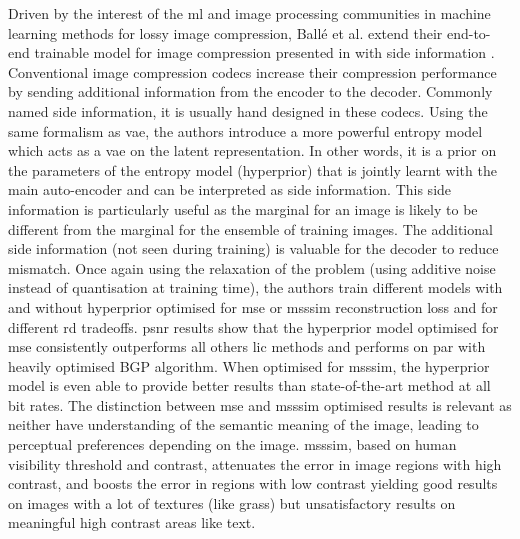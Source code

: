 \documentclass{article}
\begin{document}
Driven by the interest of the \acrshort{ml} and image processing communities in machine learning methods for lossy image compression, Ballé et al. extend their end-to-end trainable model for image compression presented in \cite{balle2017endtoendoptimizedimagecompression} with side information \cite{balle2018variationalimagecompressionscale}. Conventional image compression codecs increase their compression performance by sending additional information from the encoder to the decoder. Commonly named side information, it is usually hand designed in these codecs. Using the same formalism as \acrfull{vae}, the authors introduce a more powerful entropy model which acts as a \acrshort{vae} on the latent representation. In other words, it is a prior on the parameters of the entropy model (hyperprior) that is jointly learnt with the main auto-encoder and can be interpreted as side information. This side information is particularly useful as the marginal for an image is likely to be different from the marginal for the ensemble of training images. The additional side information (not seen during training) is valuable for the decoder to reduce mismatch. Once again using the relaxation of the problem (using additive noise instead of quantisation at training time), the authors train different models with and without hyperprior optimised for \acrshort{mse} or \acrshort{msssim} reconstruction loss and for different \acrshort{rd} tradeoffs. \acrshort{psnr} results show that the hyperprior model optimised for \acrshort{mse} consistently outperforms all others \acrshort{lic} methods and performs on par with heavily optimised BGP algorithm. When optimised for \acrshort{msssim}, the hyperprior model is even able to provide better results than state-of-the-art method at all bit rates. The distinction between \acrshort{mse} and \acrshort{msssim} optimised results is relevant as neither have understanding of the semantic meaning of the image, leading to perceptual preferences depending on the image. \acrshort{msssim}, based on human visibility threshold and contrast, attenuates the error in image regions with high contrast, and boosts the error in regions with low contrast yielding good results on images with a lot of textures (like grass) but unsatisfactory results on meaningful high contrast areas like text.
\end{document}
